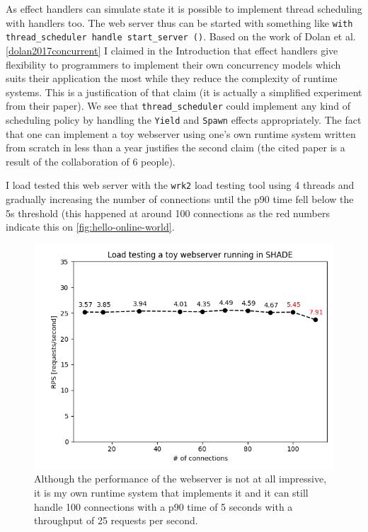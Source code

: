 \documentclass[class=article, crop=false]{standalone}
\begin{document}
As effect handlers can simulate state it is possible to implement thread
scheduling with handlers too. The web server thus can be started with something
like \lstinline{with thread_scheduler handle start_server ()}.
%
Based on the work of Dolan et al. \autoref{dolan2017concurrent} I claimed in
the Introduction that effect handlers give flexibility to programmers to
implement their own concurrency models which suits their application the most
while they reduce the complexity of runtime systems. This is a justification of
that claim (it is actually a simplified experiment from their paper). We see
that \lstinline|thread_scheduler| could implement any kind of scheduling policy by
handling the \lstinline|Yield| and \lstinline|Spawn| effects appropriately. The fact that
one can implement a toy webserver using one's own runtime system written from
scratch in less than a year justifies the second claim (the cited paper is a
result of the collaboration of 6 people).

I load tested this web server with the \lstinline|wrk2| load testing tool
\cite{wrk2-website} using 4 threads and gradually increasing the number of
connections until the p90 time fell below the 5s threshold (this happened at
around 100 connections as the red numbers indicate this on
\autoref{fig:hello-online-world}.

\begin{figure}[htb]
    \centering
    \includegraphics[width=.8\linewidth]{eval_plots/webserver.png}
    \caption[Load testing a toy webserver]{Although the performance of the webserver is not at all impressive,
    it is my own runtime system that implements it and it can still handle 100
    connections with a p90 time of 5 seconds with a throughput of 25 requests
    per second.}
    \label{fig:hello-online-world}
\end{figure}
\end{document}
